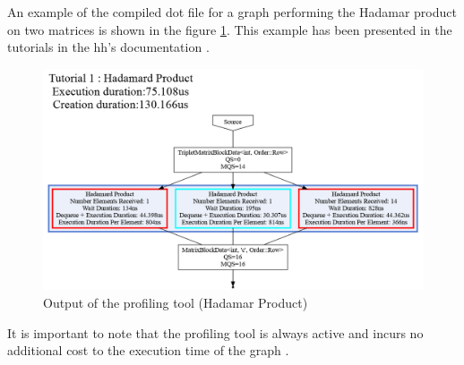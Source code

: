 An example of the compiled dot file for a graph performing the Hadamar product
on two matrices is shown in the figure \ref{fig:tuto1}. This example has been
presented in the tutorials in the \gls{hh}'s documentation \cite{hh:tuto}.

\begin{figure}[h!]
  \begin{center}
    \includegraphics[scale=0.4]{img/Tutorial1HadamardProduct.png}
    \caption{Output of the profiling tool (Hadamar Product)}
    \label{fig:tuto1}
  \end{center}
\end{figure}

It is important to note that the profiling tool is always active and incurs no
additional cost to the execution time of the graph \cite{bardakoff2021analysis}.
